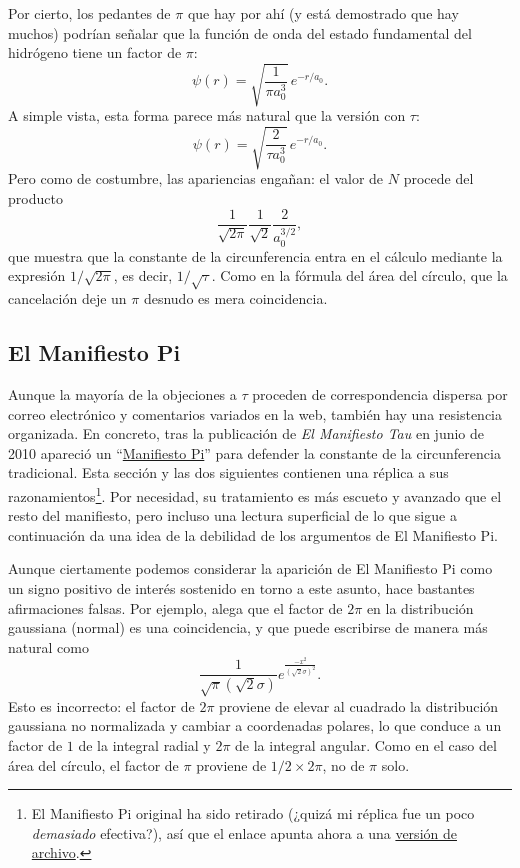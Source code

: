Por cierto, los pedantes de $\pi$ que hay por ahí (y está demostrado que hay muchos) podrían señalar que la función de onda del estado fundamental del hidrógeno tiene un factor de $\pi$:
\[
\psi(r) = \sqrt{\frac{1}{\pi a_0^3}}\,e^{-r/a_0}.
\]
A simple vista, esta forma parece más natural que la versión con $\tau$:
\[
\psi(r) = \sqrt{\frac{2}{\tau a_0^3}}\,e^{-r/a_0}.
\]
Pero como de costumbre, las apariencias engañan: el valor de $N$ procede del producto
\[
\frac{1}{\sqrt{2\pi}} \frac{1}{\sqrt{2}} \frac{2}{a_0^{3/2}},
\]
que muestra que la constante de la circunferencia entra en el cálculo mediante la expresión $1/\sqrt{2\pi}$, es decir, $1/\sqrt{\tau}$. Como en la fórmula del área del círculo, que la cancelación deje un $\pi$ desnudo es mera coincidencia.



  \subsection{El Manifiesto Pi} %
  \label{sec:the_pi_manifesto_a_rebuttal}

Aunque la mayoría de la objeciones a $\tau$ proceden de correspondencia dispersa por correo electrónico y comentarios variados en la web, también hay una resistencia organizada. En concreto, tras la publicación de \emph{El Manifiesto Tau} en junio de 2010 apareció un ``\href{https://archive.md/VnJ2x}{Manifiesto Pi}'' para defender la constante de la circunferencia tradicional. Esta sección y las dos siguientes contienen una réplica a sus razonamientos\footnote{El Manifiesto Pi original ha sido retirado (¿quizá mi réplica fue un poco \emph{demasiado} efectiva?), así que el enlace apunta ahora a una \href{https://archive.md/VnJ2x}{versión de archivo}.}. Por necesidad, su tratamiento es más escueto y avanzado que el resto del manifiesto, pero incluso una lectura superficial de lo que sigue a continuación da una idea de la debilidad de los argumentos de El Manifiesto Pi.

Aunque ciertamente podemos considerar la aparición de El Manifiesto Pi como un signo positivo de interés sostenido en torno a este asunto, hace bastantes afirmaciones falsas. Por ejemplo, alega que el factor de $2\pi$ en la distribución gaussiana (normal) es una coincidencia, y que puede escribirse de manera más natural como
\[
\frac{1}{\sqrt\pi(\sqrt 2\sigma)}e^{\frac{-x^2}{(\sqrt 2\sigma)^2}}.
\]
Esto es incorrecto: el factor de $2\pi$ proviene de elevar al cuadrado la distribución gaussiana no normalizada y cambiar a coordenadas polares, lo que conduce a un factor de $1$ de la integral radial y $2\pi$ de la integral angular. Como en el caso del área del círculo, el factor de $\pi$ proviene de $1/2\times 2\pi$, no de $\pi$ solo.

